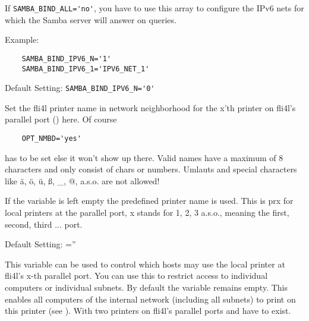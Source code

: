 \begin{description}
    If \verb+SAMBA_BIND_ALL='no'+, you have to use this array to configure the IPv6 nets
    for which the Samba server will answer on queries.

    Example:
\begin{example}
\begin{verbatim}
    SAMBA_BIND_IPV6_N='1'
    SAMBA_BIND_IPV6_1='IPV6_NET_1'
\end{verbatim}
\end{example}

    Default Setting: \verb+SAMBA_BIND_IPV6_N='0'+


    Set the fli4l printer name in network neighborhood for the x'th printer on fli4l's parallel port
    () here. Of course

\begin{example}
\begin{verbatim}
    OPT_NMBD='yes'
\end{verbatim}
\end{example}

    has to be set else it won't show up there. Valid names have a maximum of 8 characters
    and only consist of chars or numbers. Umlauts and special characters like ä, ö, ü,
    ß, \_, @, a.s.o. are not allowed!

    If the variable is left empty the predefined printer name is used. This is
    prx for local printers at the parallel port, x stands for 1, 2, 3 a.s.o., meaning the
    first, second, third ... port.

    Default Setting: =''



    This variable can be used to control which hosts may use the local
    printer at fli4l's x-th parallel port. You can use this to restrict access
    to individual computers or individual subnets. By default the variable remains empty.
    This enables all computers of the internal network (including all subnets) to print
    on this printer (see ). With
    two printers on fli4l's parallel ports
    \textbf{} and
    \textbf{} have to exist.


\end{description}
